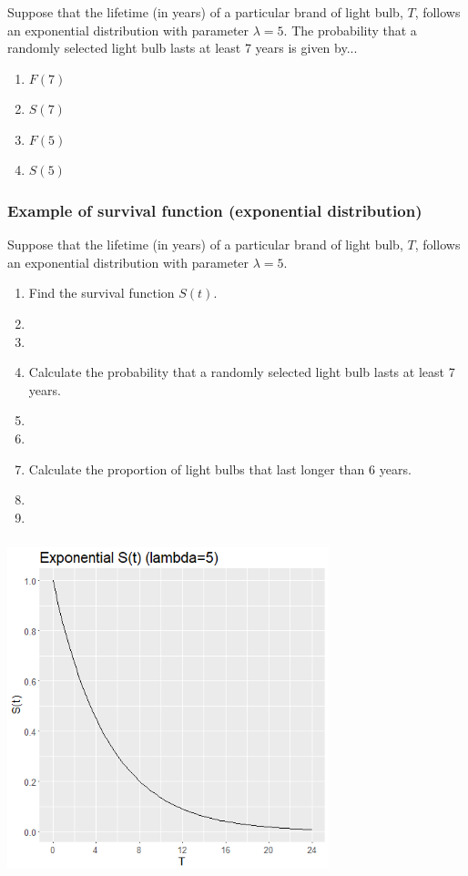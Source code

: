 \begin{frame}
\frametitle{\grp}
\begin{clicker}{Suppose that the lifetime (in years) of a particular brand of light bulb, $T$, follows an exponential distribution with parameter $\lambda=5$.  The probability that a randomly selected light bulb lasts at least 7 years is given by...}
\begin{enumerate}
\item $F(7)$
\item $S(7)$ %
\item $F(5)$
\item $S(5)$
\end{enumerate}
\end{clicker}
\end{frame}

\begin{frame}
\frametitle{Example of survival function (exponential distribution)}
Suppose that the lifetime (in years) of a particular brand of light bulb, $T$, follows an exponential distribution with parameter $\lambda=5$.
\begin{enumerate}
\item Find the survival function $S(t)$.
\item[]
\item[]
\item Calculate the probability that a randomly selected light bulb lasts at least 7 years.
\item[]
\item[]
\item Calculate the proportion of light bulbs that last longer than 6 years.
\item[]
\item[]
\end{enumerate}
\end{frame}

\begin{frame}
\frametitle{}
\includegraphics[width=0.70\textwidth]{Figures/expsurv.png}
\end{frame}

